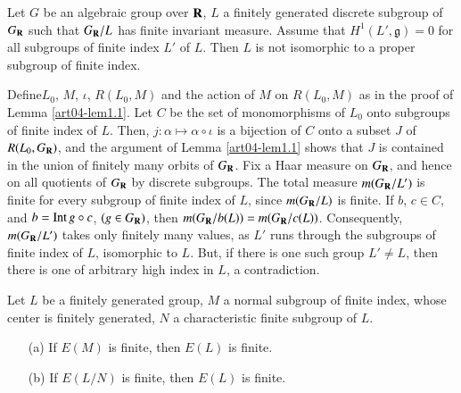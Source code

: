 \begin{lemma}\label{art04-lem1.3}
Let $G$ be an algebraic group over $\mathbf{R}$, $L$ a finitely generated discrete subgroup of $G_{\mathbf{R}}$ such that $G_{\mathbf{R}}/L$ has finite invariant measure. Assume that $H^{1}(L',\mathfrak{g})=0$ for all subgroups of finite index $L'$ of $L$. Then $L$ is not isomorphic to a proper subgroup of finite index.
\end{lemma}

Define\pageoriginale $L_{0}$, $M$, $\iota$, $R(L_{0},M)$ and the action of $M$ on $R(L_{0},M)$ as in the proof of Lemma \ref{art04-lem1.1}. Let $C$ be the set of monomorphisms of $L_{0}$ onto subgroups of finite index of $L$. Then, $j:\alpha\mapsto \alpha\circ \iota$ is a bijection of $C$ onto a subset $J$ of $R(L_{0},G_{\mathbf{R}})$, and the argument of Lemma \ref{art04-lem1.1} shows that $J$ is contained in the union of finitely many orbits of $G_{\mathbf{R}}$. Fix a Haar measure on $G_{\mathbf{R}}$, and hence on all quotients of $G_{\mathbf{R}}$ by discrete subgroups. The total measure $m(G_{\mathbf{R}}/L')$ is finite for every subgroup of finite index of $L$, since $m(G_{\mathbf{R}}/L)$ is finite. If $b$, $c\in C$, and $b=\operatorname{\mathrm{Int}} g\circ c$, $(g\in G_{\mathbf{R}})$, then $m(G_{\mathbf{R}}/b(L))=m(G_{\mathbf{R}}/c(L))$. Consequently, $m(G_{\mathbf{R}}/L')$ takes only finitely many values, as $L'$ runs through the subgroups of finite index of $L$, isomorphic to $L$. But, if there is one such group $L'\neq L$, then there is one of arbitrary high index in $L$, a contradiction.

\begin{lemma}\label{art04-lem1.4}
Let $L$ be a finitely generated group, $M$ a normal subgroup of finite index, whose center is finitely generated, $N$ a characteristic finite subgroup of $L$.
\begin{itemize}
\item[{\rm(a)}] If $E(M)$ is finite, then $E(L)$ is finite.

\item[{\rm(b)}] If $E(L/N)$ is finite, then $E(L)$ is finite.
\end{itemize}
\end{lemma}

